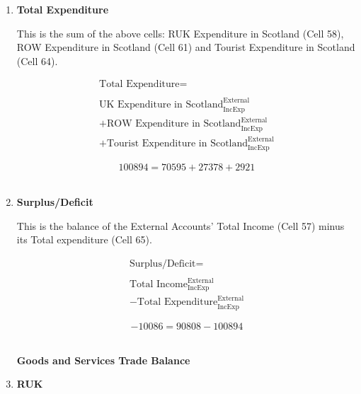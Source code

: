 \begin{enumerate}
\item \textbf {Total Expenditure}

This is the sum of the above cells: RUK Expenditure in Scotland (Cell 58), ROW Expenditure in Scotland (Cell 61) and Tourist Expenditure in Scotland (Cell 64).

\begin{equation}
\begin{split}
\text{Total Expenditure} =  \\ \\
\text{UK Expenditure in Scotland}^\text{External}_\text{IncExp}\\
+\text{ROW Expenditure in Scotland}^\text{External}_\text{IncExp}\\
+\text{Tourist Expenditure in Scotland}^\text{External}_\text{IncExp}
\end{split} \label{eq:2.5.69}
\end{equation}

\begin{equation} \nonumber
100894 = 70595+27378+2921
\end{equation}\\


\item \textbf {Surplus/Deficit}

This is the balance of the External Accounts’ Total Income (Cell 57) minus its Total expenditure (Cell 65).

\begin{equation}
\begin{split}
\text{Surplus/Deficit} =  \\ \\
\text{Total Income}^\text{External}_\text{IncExp}\\
-\text{Total Expenditure}^\text{External}_\text{IncExp}
\end{split} \label{eq:2.5.70}
\end{equation}

\begin{equation} \nonumber
-10086 = 90808-100894
\end{equation}\\



\pagebreak


\begin{center}
\textbf{\LARGE Goods and Services Trade Balance}
\end{center}

\item \textbf {RUK}


\end{enumerate}
